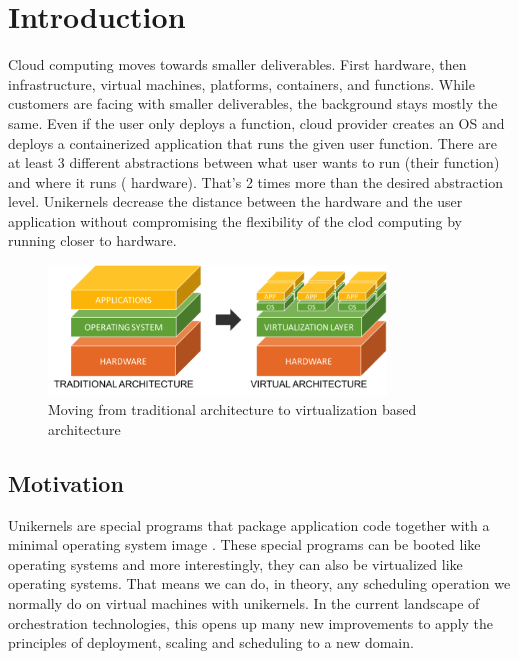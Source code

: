 
\chapter{Introduction}\label{chapter:introduction}
Cloud computing moves towards smaller deliverables. First hardware, then infrastructure, virtual machines, platforms, containers, and functions. While customers are facing with smaller deliverables, the background stays mostly the same. Even if the user only deploys a function, cloud provider creates an OS and deploys a containerized application that runs the given user function. There are at least 3 different abstractions between what user wants to run (their function) and where it runs ( hardware). That's 2 times more than the desired abstraction level. Unikernels decrease the distance between the hardware and the user application without compromising the flexibility of the clod computing by running closer to hardware.

\begin{figure}[htpb]
  \centering
  \includegraphics[width=0.8\textwidth]{figures/1-123.png}
  \caption{Moving from traditional architecture to virtualization based architecture \cite{arch-photo} } \label{fig:arch}
\end{figure}
\section{Motivation}
Unikernels are special programs that package application code together with a minimal operating system image \cite{7396164}. These special programs can be booted like operating systems and more interestingly, they can also be virtualized like operating systems. That means we can do, in theory, any scheduling operation we normally do on virtual machines with unikernels. In the current landscape of orchestration technologies, this opens up many new improvements to apply the principles of deployment, scaling and scheduling to a new domain.

